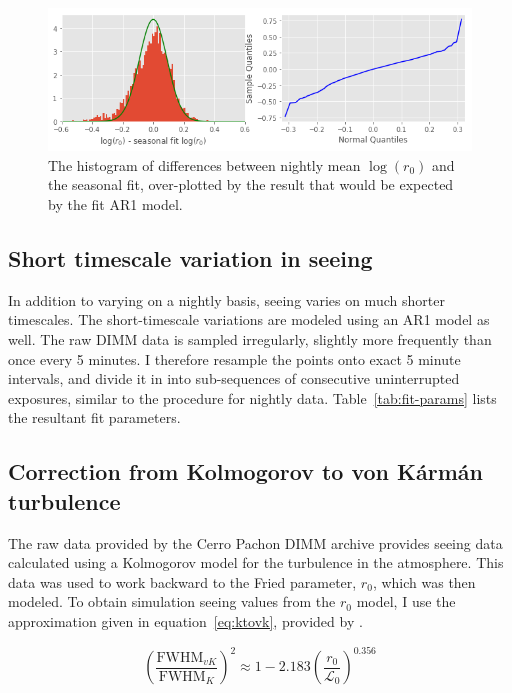 \documentclass[\docopts]{\docclass}
\begin{document}
\begin{figure}
  \includegraphics[width=\columnwidth]{night_ar1_dist.png}
  \caption{The histogram of differences between nightly mean
    $\log(r_0)$ and the seasonal fit, over-plotted by the result that
    would be expected by the fit AR1 model.}
  \label{fig:night-ar1-dist}
\end{figure}

\subsection{Short timescale variation in seeing}
\label{sec:short-variation}

In addition to varying on a nightly basis, seeing varies on much
shorter timescales. The short-timescale variations are modeled using
an AR1 model as well. The raw DIMM data is sampled irregularly,
slightly more frequently than once every 5 minutes. I therefore
resample the points onto exact 5 minute intervals, and divide it in into
sub-sequences of consecutive uninterrupted exposures, similar to the
procedure for nightly data. Table~\ref{tab:fit-params} lists the
resultant fit parameters.

\subsection{Correction from Kolmogorov to von K\'arm\'an turbulence}
\label{sec:vkcorr}

The raw data provided by the Cerro Pachon DIMM archive provides seeing
data calculated using a Kolmogorov model for the turbulence in the
atmosphere. This data was used to work backward to the Fried
parameter, $r_0$, which was then modeled. To obtain simulation seeing
values from the $r_0$ model, I use the approximation given in
equation~\ref{eq:ktovk}, provided by \cite{2002PASP..114.1156T}.

\begin{equation} \label{eq:ktovk}
\left( \frac{\mbox{FWHM}_{vK}}{\mbox{FWHM}_{K}} \right)^2
\approx 1 - 2.183 \left( \frac{r_0}{\mathcal{L}_0} \right)^{0.356}
\end{equation}
\end{document}
